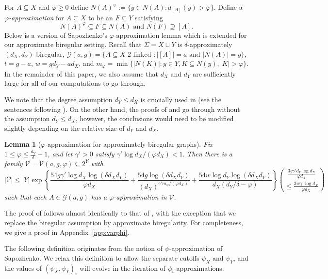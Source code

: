 \documentclass[10pt,a4paper]{amsart}
\newtheorem{lem}[thm]{Lemma}
\theoremstyle{definition}
\newcommand{\cG}{\mathcal{G} }
\newcommand{\cV}{\mathcal{V} }
\newcommand{\beq}[1]{\begin{equation}\label{#1}}
\newcommand{\enq}[0]{\end{equation}}
\newcommand{\gd}[0]{\delta }
\newcommand{\nin}[0]{\noindent}
\newcommand{\sub}[0]{\subseteq}
\newcommand{\0}[0]{\emptyset}
\begin{document}
For $A \sub X$ and $\varphi\geq 0$ define $N(A)^\varphi:=\{y \in N(A):d_{[A]}(y)>\varphi\}$. Define a \textit{$\varphi$-approximation} for $A \sub X$ to be an $F \sub Y$ satisfying 
    \[N(A)^\varphi \sub F \sub N(A) \text{ and } N(F) \supseteq [A].\]
Below is a version of Sapozhenko's $\varphi$-approximation lemma which is extended for our approximate biregular setting. Recall that $\Sigma=X \sqcup Y$ is $\gd$-approximately $(d_X, d_Y)$-biregular, $\cG(a,g)=\{A \subseteq X \text{ 2-linked }: |[A]|=a \text{ and } |N(A)|=g\}$, 
$t=g-a$, $w=gd_Y-ad_X$, and $m_\varphi=\min\{|N(K)|: y \in Y, K \sub N(y), |K| >\varphi\}.$ In the remainder of this paper, we also assume that $d_X$ and $d_Y$ are sufficiently large for all of our computations to go through. 

We note that the degree assumption $d_Y \le d_X$ is crucially used in  (see the sentences following ). On the other hand, the proofs of  and  go through without the assumption $d_Y \le d_X$, however, the conclusions would need to be modified slightly depending on the relative size of $d_Y$ and $d_X$.

\begin{lem}[$\varphi$-approximation for approximately biregular graphs]\label{lem.varphi} Fix $1 \le \varphi \le \frac{d_Y}{\gd}-1$, and let $\gamma'>0$ satisfy $\gamma'\log d_X/(\varphi d_X)<1.$ 
Then there is a family $\cV=\cV(a,g,\varphi) \sub 2^Y$ with
\beq{varphi_bd}|\cV|\le |Y|\exp\left\{\frac{54g\gamma'\log d_X \log (\delta d_Xd_Y)}{\varphi d_X}+\frac{54g\log (\delta d_Xd_Y)}{(d_X)^{\gamma'm_\varphi/(\varphi d_X)}}+\frac{54w\log d_Y \log (\delta d_Xd_Y)}{d_X(d_Y/\gd-\varphi)}\right\}{\frac{3g\gamma'd_Y\log d_X}{\varphi d_X}\choose \le \frac{3w\gamma'\log d_X}{\varphi d_X}}\enq
such that each $A \in \cG(a,g)$ has a $\varphi$-approximation in $\cV.$    
\end{lem}

\nin The proof of  follows almost identically to that of \cite[Lemma A.3]{BalGLW21}, with the exception that we replace the biregular assumption by approximate biregularity. For completeness, we give a proof in Appendix~\ref{app:varphi}. 

The following definition originates from the notion of $\psi$-approximation of Sapozhenko. We relax this definition to allow the separate cutoffs $\psi_X$ and $\psi_Y$, and the values of $(\psi_X, \psi_Y)_i$ will evolve in the iteration of $\psi_i$-approximations.
\end{document}
